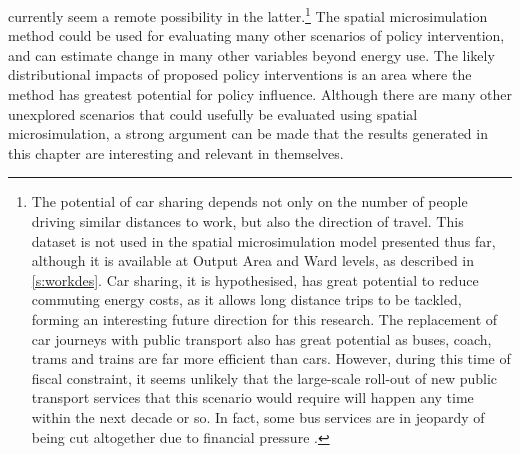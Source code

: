 currently seem a remote possibility in the 
latter.\footnote{The
potential of car sharing depends
not only on the number of people driving similar distances to work, but also the
direction of travel. This dataset is not used in the spatial microsimulation model
presented thus far, although it is available at Output Area and Ward levels,
as described in \cref{s:workdes}. Car sharing, it is hypothesised, has great
potential to reduce commuting energy costs, as it allows long distance trips
to be tackled, forming an interesting future direction for this research.
The replacement of car journeys with public transport also has great potential
as buses, coach, trams and trains are far more efficient than cars. However,
during this time of fiscal constraint, it seems unlikely that the large-scale
roll-out of new public transport services that this scenario would require
will happen any time within the next decade or so. In fact, some bus services
are in jeopardy of being cut altogether due to financial pressure \citep{Owen2012}.
}
The spatial microsimulation method could be used for evaluating many other
scenarios of policy intervention, and can estimate change in many other variables
beyond energy use. The likely distributional impacts of proposed policy interventions
is an area where the method has greatest potential for policy influence.
Although there are many other unexplored scenarios that could usefully be
evaluated using spatial microsimulation, a strong argument can be made that
the results generated in this chapter are interesting and relevant in themselves.

